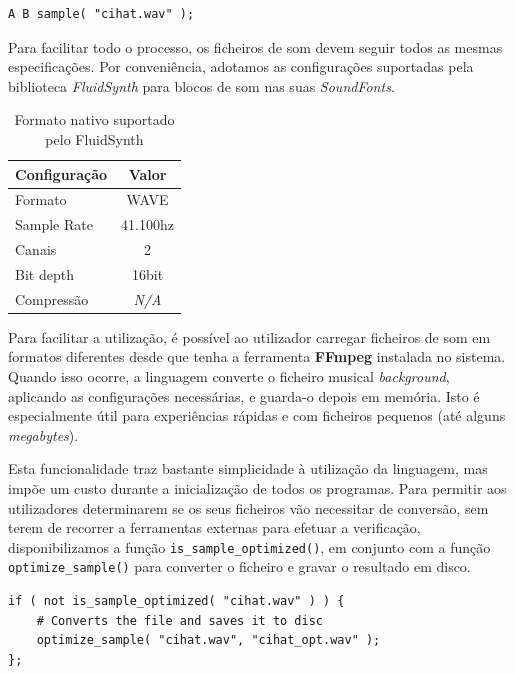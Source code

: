 \begin{lstlisting}[caption=Exemplo de reproduzir um ficheiro a seguir a duas notas]
A B sample( "cihat.wav" );
\end{lstlisting}

Para facilitar todo o processo, os ficheiros de som devem seguir todos as mesmas especificações. Por conveniência, adotamos as configurações suportadas pela biblioteca \textit{FluidSynth} para blocos de som nas suas \textit{SoundFonts}.

\begin{table}[h]
\centering
\def\arraystretch{1.3}
\begin{tabular}{|l|c|}
\hline
\textbf{Configuração} & \textbf{Valor} \\ \hline
Formato               & WAVE           \\ \hline
Sample Rate           & 41.100hz       \\ \hline
Canais                & 2              \\ \hline
Bit depth             & 16bit          \\ \hline
Compressão            & \textit{N/A}   \\ \hline
\end{tabular}
\caption{Formato nativo suportado pelo FluidSynth}
\label{tab:sounds-format}
\end{table}

Para facilitar a utilização, é possível ao utilizador carregar ficheiros de som em formatos diferentes desde que tenha a ferramenta \textbf{FFmpeg} instalada no sistema. Quando isso ocorre, a linguagem converte o ficheiro musical \textit{background}, aplicando as configurações necessárias, e guarda-o depois em memória. Isto é especialmente útil para experiências rápidas e com ficheiros pequenos (até alguns \textit{megabytes}).

Esta funcionalidade traz bastante simplicidade à utilização da linguagem, mas impõe um custo durante a inicialização de todos os programas. Para permitir aos utilizadores determinarem se os seus ficheiros vão necessitar de conversão, sem terem de recorrer a ferramentas externas para efetuar a verificação, disponibilizamos a função \texttt{is\_sample\_optimized()}, em conjunto com a função \texttt{optimize\_sample()} para converter o ficheiro e gravar o resultado em disco.

\begin{lstlisting}[caption={Verificar se um ficheiro de audio está optimizado, e convertê-lo caso contrário}]
if ( not is_sample_optimized( "cihat.wav" ) ) {
    # Converts the file and saves it to disc
    optimize_sample( "cihat.wav", "cihat_opt.wav" );
};
\end{lstlisting}

